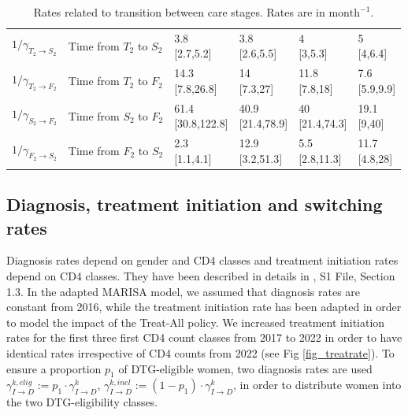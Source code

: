 \documentclass{article}
\begin{document}
\begin{table}[H]
{\begin{tabular}{l
	p{}
	p{}
	p{}
	p{}
	p{}
}
  $1/\gamma_{T_2\rightarrow S_2}$ & Time from $T_2$ to $S_2$ & \makecell{3.8\\[0cm]  [2.7,5.2]} & \makecell{3.8\\[0cm]  [2.6,5.5]} & \makecell{4\\[0cm]  [3,5.3]} & \makecell{5\\[0cm]  [4,6.4]} \\ 
  $1/\gamma_{T_2\rightarrow F_2}$ & Time from $T_2$ to $F_2$ & \makecell{14.3\\[0cm]  [7.8,26.8]} & \makecell{14\\[0cm]  [7.3,27]} & \makecell{11.8\\[0cm]  [7.8,18]} & \makecell{7.6\\[0cm]  [5.9,9.9]} \\ 
  $1/\gamma_{S_2\rightarrow F_2}$ & Time from $S_2$ to $F_2$ & \makecell{61.4\\[0cm]  [30.8,122.8]} & \makecell{40.9\\[0cm]  [21.4,78.9]} & \makecell{40\\[0cm]  [21.4,74.3]} & \makecell{19.1\\[0cm]  [9,40]} \\ 
  $1/\gamma_{F_2\rightarrow S_2}$ & Time from $F_2$ to $S_2$ & \makecell{2.3\\[0cm]  [1.1,4.1]} & \makecell{12.9\\[0cm]  [3.2,51.3]} & \makecell{5.5\\[0cm]  [2.8,11.3]} & \makecell{11.7\\[0cm]  [4.8,28]} \\ 
		\hline
	\end{tabular}
}
\caption{Rates related to transition between care stages. Rates are in $\text{month}^{-1}$.}
\label{tab2}
\end{table}

\subsection{Diagnosis, treatment initiation and switching rates}
Diagnosis rates depend on gender and CD4 classes and treatment initiation rates depend on CD4 classes. They have been described in details in \cite{Hauser2019}, S1 File, Section 1.3. In the adapted MARISA model, we assumed that diagnosis rates are constant from 2016, while the treatment initiation rate has been adapted in order to model the impact of the Treat-All policy. We increased treatment initiation rates for the first three first CD4 count classes from 2017 to 2022 in order to have identical rates irrespective of CD4 counts from 2022 (see Fig \ref{fig_treatrate}). To ensure a proportion $p_1$ of DTG-eligible women, two diagnosis rates are used $\gamma_{I\rightarrow D}^{k,elig}:=p_1\cdot\gamma_{I\rightarrow D}^{k}$, $\gamma_{I\rightarrow D}^{k,inel}:=(1-p_1)\cdot\gamma_{I\rightarrow D}^{k}$, in order to distribute women into the two DTG-eligibility classes.
\end{document}
